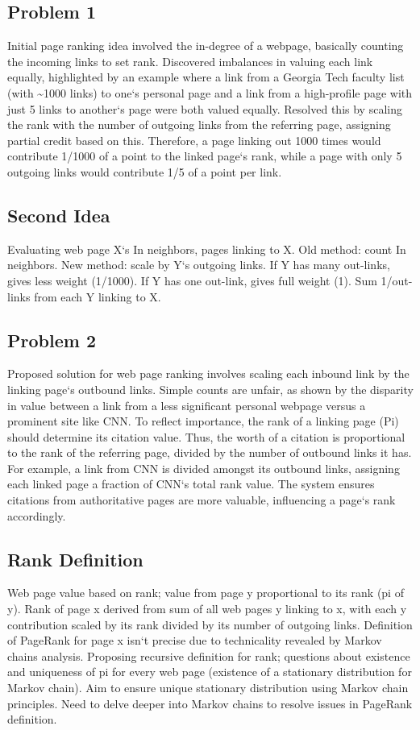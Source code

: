 \subsection*{Problem 1}
Initial page ranking idea involved the in-degree of a webpage, basically counting the incoming links to set rank.
Discovered imbalances in valuing each link equally, highlighted by an example where a link from a Georgia Tech faculty list (with \textasciitilde{}1000 links) to one`s personal page and a link from a high-profile page with just 5 links to another`s page were both valued equally.
Resolved this by scaling the rank with the number of outgoing links from the referring page, assigning partial credit based on this.
Therefore, a page linking out 1000 times would contribute 1/1000 of a point to the linked page`s rank, while a page with only 5 outgoing links would contribute 1/5 of a point per link.

\subsection*{Second Idea}
Evaluating web page X`s In neighbors, pages linking to X\@.
Old method: count In neighbors.
New method: scale by Y`s outgoing links.
If Y has many out-links, gives less weight (1/1000).
If Y has one out-link, gives full weight (1).
Sum 1/out-links from each Y linking to X\@.

\subsection*{Problem 2}
Proposed solution for web page ranking involves scaling each inbound link by the linking page`s outbound links.
Simple counts are unfair, as shown by the disparity in value between a link from a less significant personal webpage versus a prominent site like CNN\@.
To reflect importance, the rank of a linking page (Pi) should determine its citation value.
Thus, the worth of a citation is proportional to the rank of the referring page, divided by the number of outbound links it has.
For example, a link from CNN is divided amongst its outbound links, assigning each linked page a fraction of CNN`s total rank value.
The system ensures citations from authoritative pages are more valuable, influencing a page`s rank accordingly.

\subsection*{Rank Definition}
Web page value based on rank; value from page y proportional to its rank (pi of y).
Rank of page x derived from sum of all web pages y linking to x, with each y contribution scaled by its rank divided by its number of outgoing links.
Definition of PageRank for page x isn`t precise due to technicality revealed by Markov chains analysis.
Proposing recursive definition for rank; questions about existence and uniqueness of pi for every web page (existence of a stationary distribution for Markov chain).
Aim to ensure unique stationary distribution using Markov chain principles.
Need to delve deeper into Markov chains to resolve issues in PageRank definition.

